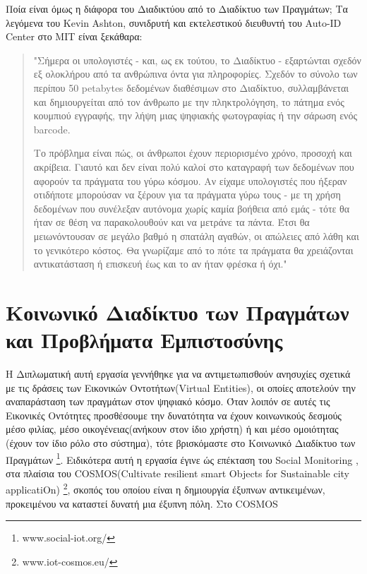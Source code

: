 Ποία είναι όμως η διάφορα του Διαδικτύου από το Διαδίκτυο των Πραγμάτων; 
\newpage
Τα λεγόμενα του Kevin Ashton, συνιδρυτή και εκτελεστικού διευθυντή του Auto-ID Center στο ΜΙΤ είναι ξεκάθαρα:\cite{Ashton}
\begin{quotation}

"Σήμερα οι υπολογιστές - και, ως εκ τούτου, το Διαδίκτυο - εξαρτώνται σχεδόν εξ ολοκλήρου από τα ανθρώπινα όντα για πληροφορίες. Σχεδόν το σύνολο των περίπου 50 petabytes δεδομένων διαθέσιμων στο Διαδίκτυο, συλλαμβάνεται και δημιουργείται από τον άνθρωπο με την πληκτρολόγηση, το πάτημα ενός κουμπιού εγγραφής, την λήψη μιας ψηφιακής φωτογραφίας ή την σάρωση ενός barcode.


Το πρόβλημα είναι πώς, οι άνθρωποι έχουν περιορισμένο χρόνο, προσοχή και ακρίβεια. Γιαυτό και δεν είναι πολύ καλοί στο καταγραφή των δεδομένων που αφορούν τα πράγματα του γύρω κόσμου. Αν είχαμε υπολογιστές που ήξεραν οτιδήποτε μπορούσαν να ξέρουν για τα πράγματα γύρω τους - με τη χρήση δεδομένων που συνέλεξαν αυτόνομα χωρίς καμία βοήθεια από εμάς - τότε θα ήταν σε θέση να παρακολουθούν και να μετράνε τα πάντα. Έτσι θα μειωνόντουσαν σε μεγάλο βαθμό η σπατάλη αγαθών, οι απώλειες από λάθη και το γενικότερο κόστος. Θα γνωρίζαμε από το πότε τα πράγματα θα χρειάζονται αντικατάσταση ή επισκευή  έως και το αν ήταν φρέσκα ή όχι." 
\end{quotation}


\section{Κοινωνικό Διαδίκτυο των Πραγμάτων και Προβλήματα Εμπιστοσύνης}

Η Διπλωματική αυτή εργασία γεννήθηκε για να αντιμετωπισθούν ανησυχίες σχετικά με τις δράσεις των Εικονικών Οντοτήτων(Virtual Entities), οι οποίες αποτελούν την αναπαράσταση των πραγμάτων στον ψηφιακό κόσμο. Όταν λοιπόν σε αυτές τις Εικονικές Οντότητες προσθέσουμε την δυνατότητα να έχουν κοινωνικούς δεσμούς μέσο φιλίας, μέσο οικογένειας(ανήκουν στον ίδιο χρήστη) ή και μέσο ομοιότητας (έχουν τον ίδιο ρόλο στο σύστημα), τότε βρισκόμαστε στο Κοινωνικό Διαδίκτυο των Πραγμάτων \footnote{www.social-iot.org/}. Ειδικότερα αυτή η εργασία έγινε ώς επέκταση του Social Monitoring \cite{Orfeas2}, \cite{Orfeas1} στα πλαίσια του COSMOS(Cultivate resilient smart Objects for Sustainable city applicatiOn) \footnote{www.iot-cosmos.eu/}, σκοπός του οποίου είναι η δημιουργία έξυπνων αντικειμένων, προκειμένου να καταστεί δυνατή μια έξυπνη πόλη. Στο COSMOS

